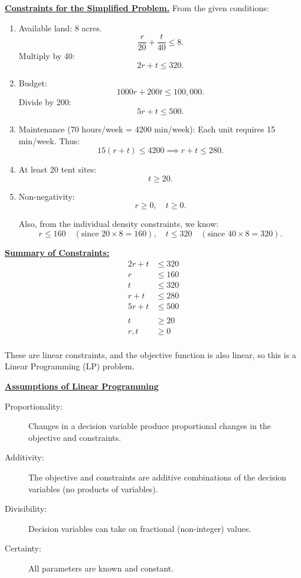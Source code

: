 \underline{\textbf{Constraints for the Simplified Problem.}} 
From the given conditions:

\begin{enumerate}
\item  Available land: $8$ acres.
   \[
   \frac{r}{20} + \frac{t}{40} \leq 8.
   \]
   Multiply by 40:
   \[
   2r + t \leq 320.
   \]

\item  Budget: 
   \[
   1000r + 200t \leq 100{,}000.
   \]
   Divide by 200:
   \[
   5r + t \leq 500.
   \]

\item  Maintenance (70 hours/week = 4200 min/week):
   Each unit requires 15 min/week. Thus:
   \[
   15(r + t) \leq 4200 \implies r + t \leq 280.
   \]

\item  At least 20 tent sites:
   \[
   t \geq 20.
   \]

\item  Non-negativity:
   \[
   r \geq 0, \quad t \geq 0.
   \]

Also, from the individual density constraints, we know:
\[
r \leq 160 \quad (\text{since } 20 \times 8 = 160), \quad t \leq 320 \quad (\text{since } 40 \times 8 = 320).
\]
\end{enumerate}

\underline{\textbf{Summary of Constraints:}}
\begin{align*}
2r + t &\leq 320 \\
r &\leq 160 \\
t &\leq 320 \\
r + t &\leq 280 \\
5r + t &\leq 500\\
\\
t &\geq 20 \\
r, t &\geq 0 \\
\end{align*}

These are linear constraints, and the objective function is also linear, so this is a Linear Programming (LP) problem.

\underline{\textbf{Assumptions of Linear Programming}}
\begin{description}
    \item[Proportionality:] Changes in a decision variable produce proportional changes in the objective and constraints.\checkmark

    \item[Additivity:] The objective and constraints are additive combinations of the decision variables (no products of variables).
    \item[Divisibility:] Decision variables can take on fractional (non-integer) values.\checkmark
    \item[Certainty:] All parameters are known and constant.\checkmark
\end{description}

